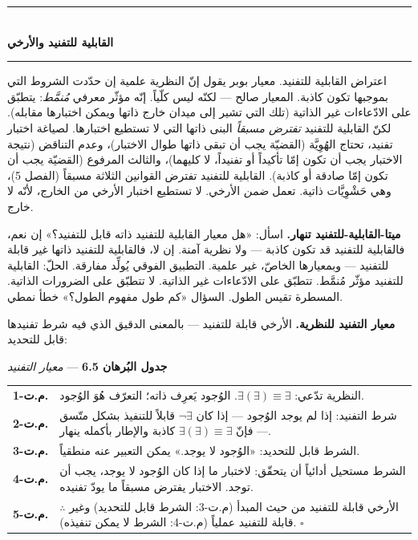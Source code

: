 \documentclass[10pt, openany, oneside]{book}
\renewcommand{\normalsize}{\fontsize{10}{13}\selectfont}
\renewcommand{\footnotesize}{\fontsize{8.5}{11}\selectfont}
\begin{document}
\begin{center}
    \rule{0.3\textwidth}{0.4pt}\\[0.5em]
    {\normalsize\bfseries القابلية للتفنيد والأرخي}\\[0.3em]
    \rule{0.3\textwidth}{0.4pt}
\end{center}

\vspace{1em}

\noindent اعتراض القابلية للتفنيد. معيار بوبر يقول إنّ النظرية علمية إن حدّدت الشروط التي بموجبها تكون كاذبة. المعيار صالح --- لكنّه ليس كلّياً. إنّه مؤثّر معرفي \textit{مُنمَّط}: يتطبّق على الادّعاءات غير الذاتية (تلك التي تشير إلى ميدان خارج ذاتها ويمكن اختبارها مقابله). لكنّ القابلية للتفنيد \textit{تفترض مسبقاً} البنى ذاتها التي لا تستطيع اختبارها. لصياغة اختبار تفنيد، تحتاج الهُوِيَّة (القضيّة يجب أن تبقى ذاتها طوال الاختبار)، وعدم التناقض (نتيجة الاختبار يجب أن تكون إمّا تأكيداً أو تفنيداً، لا كليهما)، والثالث المرفوع (القضيّة يجب أن تكون إمّا صادقة أو كاذبة). القابلية للتفنيد تفترض القوانين الثلاثة مسبقاً (الفصل 5)، وهي حَشْوِيَّات ذاتية. تعمل \textit{ضمن} الأرخي. لا تستطيع اختبار الأرخي من الخارج، لأنّه لا خارج.

\textbf{ميتا-القابلية-للتفنيد تنهار.} اسأل: «هل معيار القابلية للتفنيد ذاته قابل للتفنيد؟» إن نعم، فالقابلية للتفنيد قد تكون كاذبة --- ولا نظرية آمنة. إن لا، فالقابلية للتفنيد ذاتها غير قابلة للتفنيد --- وبمعيارها الخاصّ، غير علمية. التطبيق الفوقي يُولِّد مفارقة. الحلّ: القابلية للتفنيد مؤثّر مُنمَّط. تتطبّق على الادّعاءات غير الذاتية. لا تتطبّق على الضرورات الذاتية. المسطرة تقيس الطول. السؤال «كم طول مفهوم الطول؟» خطأ نمطي.

\textbf{معيار التفنيد للنظرية.} الأرخي قابلة للتفنيد --- بالمعنى الدقيق الذي فيه شرط تفنيدها قابل للتحديد:

\vspace{0.5em}

\textbf{جدول البُرهان 6.5} --- \textit{معيار التفنيد}

\vspace{0.5em}

{\footnotesize
\noindent\begin{tabular}{r p{}}
\textbf{م.ت-1.} & النظرية تدّعي: $\exists(\exists) \equiv \exists$. الوُجود يَعرِف ذاته؛ التعرّف هُوَ الوُجود. \\[0.3em]
\textbf{م.ت-2.} & شرط التفنيد: إذا لم يوجد الوُجود --- إذا كان $\neg\exists$ قابلاً للتنفيذ بشكل متّسق --- فإنّ $\exists(\exists) \equiv \exists$ كاذبة والإطار بأكمله ينهار. \\[0.3em]
\textbf{م.ت-3.} & الشرط قابل للتحديد: «الوُجود لا يوجد.» يمكن التعبير عنه منطقياً. \\[0.3em]
\textbf{م.ت-4.} & الشرط مستحيل أدائياً أن يتحقّق: لاختبار ما إذا كان الوُجود لا يوجد، يجب أن توجد. الاختبار يفترض مسبقاً ما يودّ تفنيده. \\[0.3em]
\textbf{م.ت-5.} & $\therefore$ الأرخي قابلة للتفنيد من حيث المبدأ (م.ت-3: الشرط قابل للتحديد) وغير قابلة للتفنيد عملياً (م.ت-4: الشرط لا يمكن تنفيذه). $\square$ \\[0.3em]
\end{tabular}
}
\end{document}
